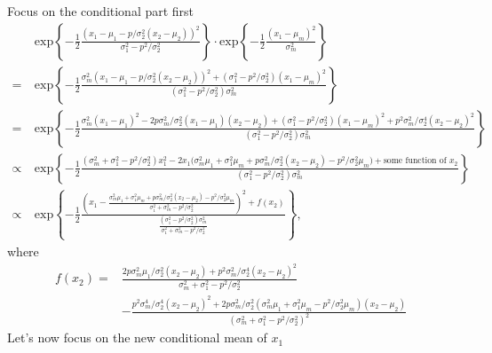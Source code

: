 \documentclass[10pt]{article}
\newcommand{\expb}[1]{\ensuremath{\mathrm{exp}\left\{#1\right\}}}
\begin{document}
Focus on the conditional part first
\begin{align*}
	&\expb{-\frac{1}{2} \frac{(x_1-\mu_1-p/\sigma_2^2(x_2-\mu_2))^2}{\sigma_1^2-p^2/\sigma_2^2}} \cdot \expb{-\frac{1}{2} \frac{(x_1-\mu_m)^2}{\sigma_m^2}} \\
	= \ &\expb{-\frac{1}{2} \frac{\sigma_m^2(x_1-\mu_1-p/\sigma_2^2(x_2-\mu_2))^2 + (\sigma_1^2-p^2/\sigma_2^2)(x_1-\mu_m)^2}{(\sigma_1^2-p^2/\sigma_2^2)\sigma_m^2}} \\
	= \ &\expb{-\frac{1}{2} \frac{\sigma_m^2(x_1-\mu_1)^2 - 2p\sigma_m^2/\sigma_2^2(x_1-\mu_1)(x_2-\mu_2) + (\sigma_1^2-p^2/\sigma_2^2)(x_1-\mu_m)^2 + p^2\sigma_m^2/\sigma_2^4(x_2-\mu_2)^2}{(\sigma_1^2-p^2/\sigma_2^2)\sigma_m^2}} \\
	\propto \ &\expb{-\frac{1}{2} \frac{(\sigma_m^2+\sigma_1^2-p^2/\sigma_2^2)x_1^2 - 2x_1\big( \sigma_m^2\mu_1 + \sigma_1^2\mu_m + p\sigma_m^2/\sigma_2^2(x_2-\mu_2) - p^2/\sigma_2^2\mu_m \big) + \text{some function of }x_2}{(\sigma_1^2-p^2/\sigma_2^2)\sigma_m^2}} \\
	\propto \ &\expb{-\frac{1}{2} \frac{\left( x_1-\frac{\sigma_m^2\mu_1 + \sigma_1^2\mu_m + p\sigma_m^2/\sigma_2^2(x_2-\mu_2)-p^2/\sigma_2^2\mu_m}{\sigma_1^2+\sigma_m^2-p^2/\sigma_2^2} \right)^2 + f(x_2)}{\frac{(\sigma_1^2-p^2/\sigma_2^2)\sigma_m^2}{\sigma_1^2+\sigma_m^2-p^2/\sigma_2^2}}},
\end{align*}
where
\begin{align*}
	f(x_2) = &\frac{2p\sigma_m^2\mu_1/\sigma_2^2(x_2-\mu_2) + p^2\sigma_m^2/\sigma_2^4(x_2-\mu_2)^2}{\sigma_m^2+\sigma_1^2-p^2/\sigma_2^2} \\
	&- \frac{p^2\sigma_m^4/\sigma_2^4(x_2-\mu_2)^2 + 2p\sigma_m^2/\sigma_2^2(\sigma_m^2\mu_1+\sigma_1^2\mu_m-p^2/\sigma_2^2\mu_m)(x_2-\mu_2)}{(\sigma_m^2+\sigma_1^2-p^2/\sigma_2^2)^2}
\end{align*}
Let's now focus  on the new conditional mean of $x_1$
\end{document}
